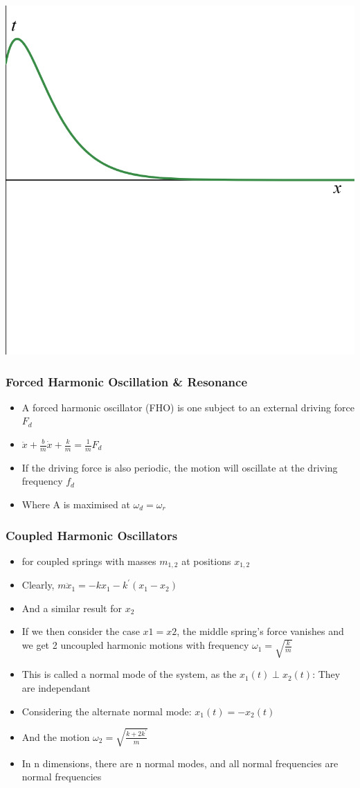 \documentclass{article}
\begin{document}
\begin{itemize}
    \includegraphics[width=.5\linewidth]{year1/wfmp/periodic-motion/critically damped.png}

\end{itemize}

\subsubsection*{Forced Harmonic Oscillation \& Resonance}

\begin{itemize}
    \item A forced harmonic oscillator (FHO) is one subject to an external driving force \(F_d\)
    \item \(\ddot x + \frac{b}{m}\dot x + \frac{k}{m}=\frac{1}{m}F_d\)
    \item If the driving force is also periodic, the motion will oscillate at the driving frequency \(f_d\)
    \item Where A is maximised at \(\omega_d=\omega_r\)
\end{itemize}

\subsubsection*{Coupled Harmonic Oscillators}
\begin{itemize}
    \item for coupled springs with masses \(m_{1,2}\) at positions \(x_{1,2}\)
    \item Clearly, \(m\ddot x_1 =-kx_1 -k^{\prime}(x_1-x_2)\)
    \item And a similar result for \(x_2\)
    \item If we then consider the case \(x1=x2\), the middle spring's force vanishes and we get 2 uncoupled harmonic motions with frequency \(\omega_1=\sqrt{\frac{k}{m}}\)
    \item This is called a normal mode of the system, as the \(x_1(t)\perp x_2(t)\): They are independant  
    \item Considering the alternate normal mode: \(x_1(t)=-x_2(t)\)
    \item And the motion \(\omega_2=\sqrt{\frac{k+2k^{\prime}}{m}}\)
    \item In n dimensions, there are n normal modes, and all normal frequencies are normal frequencies
\end{itemize}
\end{document}
